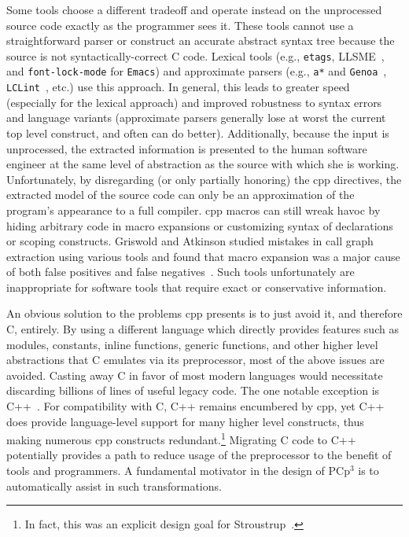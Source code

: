 \documentclass{article}
\newcommand{\pcp}{\mbox{\textsf{PCp}$^3$}}
\newcommand{\Cpp}{\mbox{\textsf{cpp}}}
\newcommand{\CPP}{\mbox{\textsf{C++}}}
\newcommand{\C}{\mbox{\textsf{C}}}
\newcommand{\eg}{e.g.,}
\newcommand{\etc}{etc}  %
\begin{document}
Some tools choose a different tradeoff and operate instead on the
unprocessed source code exactly as the programmer sees it.  These tools
cannot use a straightforward parser or construct an accurate abstract
syntax tree because the source is not syntactically-correct \C{} code.
Lexical tools (\eg{} \texttt{etags}, LLSME~\cite{Murphy95}, and
\texttt{font-lock-mode} for \texttt{Emacs}) and approximate parsers
(\eg{} \texttt{a*} and \texttt{Genoa}~\cite{Griswold96},
\texttt{LCLint}~\cite{LCLint}, \etc.) use this approach.  In general,
this leads to greater speed (especially for the lexical approach) and
improved robustness to syntax errors and language variants (approximate
parsers generally lose at worst the current top level construct, and
often can do better). Additionally, because the input is unprocessed,
the extracted information is presented to the human software engineer at
the same level of abstraction as the source with which she is working.
Unfortunately, by disregarding (or only partially honoring) the \Cpp{}
directives, the extracted model of the source code can only be an
approximation of the program's appearance to a full compiler.  \Cpp{}
macros can still wreak havoc by hiding arbitrary code in macro
expansions or customizing syntax of declarations or scoping constructs.
Griswold and Atkinson studied mistakes in call graph extraction using
various tools and found that macro expansion was a major cause of both
false positives and false negatives~\cite{Griswold96}.  Such tools
unfortunately are inappropriate for software tools that require exact or
conservative information.

An obvious solution to the problems \Cpp{} presents is to just avoid it,
and therefore \C{}, entirely.  By using a different language which
directly provides features such as modules, constants, inline functions,
generic functions, and other higher level abstractions that \C{}
emulates via its preprocessor, most of the above issues are avoided.
Casting away \C{} in favor of most modern languages would necessitate
discarding billions of lines of useful legacy code.  The one notable
exception is \CPP{}~\cite{CD2DraftStandard}. For compatibility with
\C{}, \CPP{} remains encumbered by \Cpp{}, yet \CPP{} does provide
language-level support for many higher level constructs, thus making
numerous \Cpp{} constructs redundant.\footnote{In fact, this was an
  explicit design goal for Stroustrup~\cite[p.~424]{Stroustrup94}.}
Migrating \C{} code to \CPP{} potentially provides a path to reduce
usage of the preprocessor to the benefit of tools and programmers.  A
fundamental motivator in the design of \pcp{} is to automatically assist
in such transformations.
\end{document}
